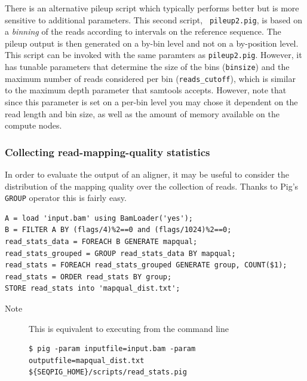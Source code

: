 There is an alternative pileup script which typically performs better but
is more sensitive to additional parameters. This second script, {\tt
pileup2.pig}, is based on a \emph{binning} of the reads according to
intervals on the reference sequence. The pileup output is then generated on
a by-bin level and not on a by-position level. This script can be invoked
with the same paramters as {\tt pileup2.pig}. However, it has tunable
parameters that determine the size of the bins ({\tt binsize}) and the
maximum number of reads considered per bin ({\tt reads\_cutoff}), which is
similar to the maximum depth parameter that samtools accepts. However,
note that since this parameter is set on a per-bin level you may chose it dependent on
the read length and bin size, as well as the amount of memory available on
the compute nodes.


\subsubsection{Collecting read-mapping-quality statistics}
In order to evaluate the output of an aligner, it may be useful to
consider the distribution of the mapping quality over the collection of
reads. Thanks to Pig's {\tt GROUP} operator this is fairly easy.
\begin{lstlisting}
A = load 'input.bam' using BamLoader('yes');
B = FILTER A BY (flags/4)%2==0 and (flags/1024)%2==0;
read_stats_data = FOREACH B GENERATE mapqual;
read_stats_grouped = GROUP read_stats_data BY mapqual;
read_stats = FOREACH read_stats_grouped GENERATE group, COUNT($1);
read_stats = ORDER read_stats BY group;
STORE read_stats into 'mapqual_dist.txt';
\end{lstlisting}
\begin{description}
	\item[Note] This is equivalent to executing from the command line
\begin{lstlisting}
$ pig -param inputfile=input.bam -param outputfile=mapqual_dist.txt ${SEQPIG_HOME}/scripts/read_stats.pig
\end{lstlisting}
\end{description}

